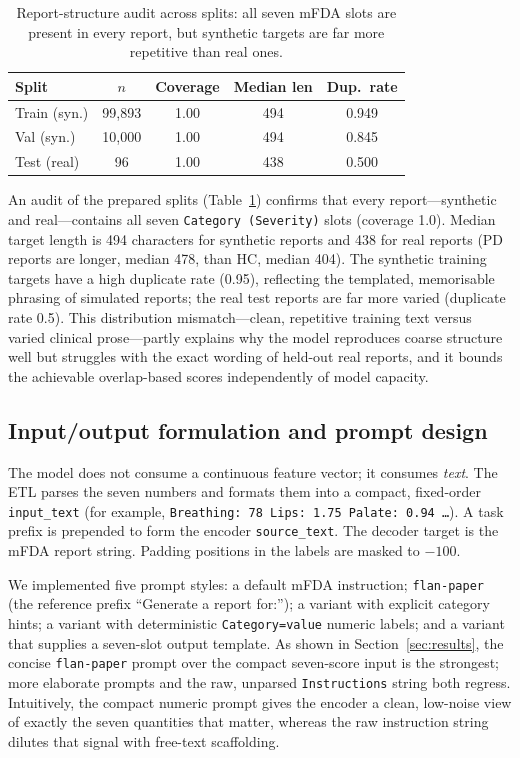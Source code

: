 \documentclass[11pt,twocolumn]{article}
\newcommand{\bt}[1]{\texttt{#1}}
\begin{document}
\begin{table}[t]
\centering
\caption{Report-structure audit across splits: all seven mFDA slots are present in every report,
but synthetic targets are far more repetitive than real ones.}
\label{tab:audit}
\small
\begin{tabular}{lcccc}
\toprule
Split & $n$ & Coverage & Median len & Dup.\ rate \\
\midrule
Train (syn.) & 99{,}893 & 1.00 & 494 & 0.949 \\
Val (syn.)   & 10{,}000 & 1.00 & 494 & 0.845 \\
Test (real)  & 96       & 1.00 & 438 & 0.500 \\
\bottomrule
\end{tabular}
\end{table}

An audit of the prepared splits (Table~\ref{tab:audit}) confirms that every report---synthetic
and real---contains all seven \bt{Category (Severity)} slots (coverage 1.0). Median target length
is 494 characters for synthetic reports and 438 for real reports (PD reports are longer, median
478, than HC, median 404). The synthetic training targets have a high duplicate rate (0.95),
reflecting the templated, memorisable phrasing of simulated reports; the real test reports are
far more varied (duplicate rate 0.5). This distribution mismatch---clean, repetitive training
text versus varied clinical prose---partly explains why the model reproduces coarse structure
well but struggles with the exact wording of held-out real reports, and it bounds the achievable
overlap-based scores independently of model capacity.

\subsection{Input/output formulation and prompt design}
The model does not consume a continuous feature vector; it consumes \emph{text}. The ETL parses
the seven numbers and formats them into a compact, fixed-order \bt{input\_text} (for example,
\bt{Breathing: 78 Lips: 1.75 Palate: 0.94 \dots}). A task prefix is prepended to form the encoder
\bt{source\_text}. The decoder target is the mFDA report string. Padding positions in the labels
are masked to $-100$.

We implemented five prompt styles: a default mFDA instruction; \bt{flan-paper} (the reference
prefix ``Generate a report for:''); a variant with explicit category hints; a variant with
deterministic \bt{Category=value} numeric labels; and a variant that supplies a seven-slot output
template. As shown in Section~\ref{sec:results}, the concise \bt{flan-paper} prompt over the
compact seven-score input is the strongest; more elaborate prompts and the raw, unparsed
\bt{Instructions} string both regress. Intuitively, the compact numeric prompt gives the encoder
a clean, low-noise view of exactly the seven quantities that matter, whereas the raw instruction
string dilutes that signal with free-text scaffolding.
\end{document}
